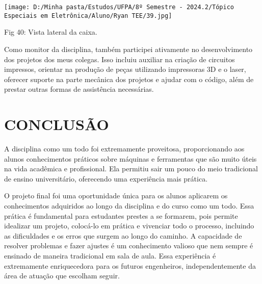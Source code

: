 \documentclass[
]{book}
\begin{document}
\texttt{[image: D:/Minha pasta/Estudos/UFPA/8º Semestre - 2024.2/Tópico Especiais em Eletrônica/Aluno/Ryan TEE/39.jpg]}

Fig 40: Vista lateral da caixa.

Como monitor da disciplina, também participei ativamente no desenvolvimento dos projetos dos meus colegas. Isso incluiu auxiliar na criação de circuitos impressos, orientar na produção de peças utilizando impressoras 3D e o laser, oferecer suporte na parte mecânica dos projetos e ajudar com o código, além de prestar outras formas de assistência necessárias.

\chapter{CONCLUSÃO}\label{conclusuxe3o}

A disciplina como um todo foi extremamente proveitosa, proporcionando aos alunos conhecimentos práticos sobre máquinas e ferramentas que são muito úteis na vida acadêmica e profissional. Ela permitiu sair um pouco do meio tradicional de ensino universitário, oferecendo uma experiência mais prática.

O projeto final foi uma oportunidade única para os alunos aplicarem os conhecimentos adquiridos ao longo da disciplina e do curso como um todo. Essa prática é fundamental para estudantes prestes a se formarem, pois permite idealizar um projeto, colocá-lo em prática e vivenciar todo o processo, incluindo as dificuldades e os erros que surgem ao longo do caminho. A capacidade de resolver problemas e fazer ajustes é um conhecimento valioso que nem sempre é ensinado de maneira tradicional em sala de aula. Essa experiência é extremamente enriquecedora para os futuros engenheiros, independentemente da área de atuação que escolham seguir.

  
\end{document}
